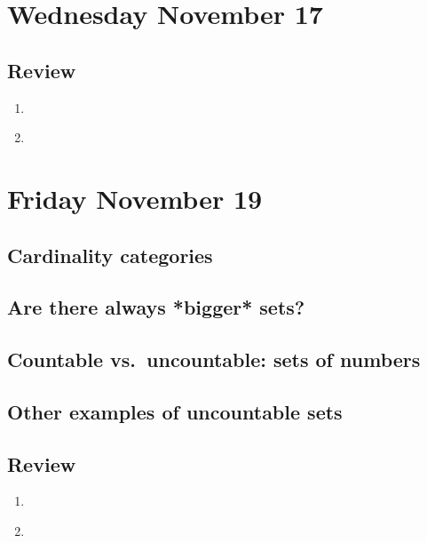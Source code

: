 \section*{Wednesday November 17}

\vspace{100pt}

\newpage



\newpage
\subsection*{Review}
\begin{enumerate}
    \item  
    \item \hspace{1in}\\ 
\end{enumerate}

\newpage
\section*{Friday November 19}
\subsection*{Cardinality categories}


\newpage
\subsection*{Are there always *bigger* sets?}

\newpage
\subsection*{Countable vs.\ uncountable: sets of numbers}

\subsection*{Other examples of uncountable sets}

\newpage
\subsection*{Review}
\begin{enumerate}
    \item \hspace{1in}\\ 
    \item \hspace{1in}\\ 
\end{enumerate}
